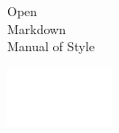 \documentclass[10pt,
	paper=14cm:21cm,
	DIV=12,
	headinclude=yes,
	footinclude=no,
	twoside=no]{scrartcl}
\begin{document}
{ %
\thispagestyle{empty}
\setlength\parindent{0pt}
\afterpage{\restorepagecolor}
\color{white}
\begin{raggedleft}

Open \\
Markdown \\
Manual of Style

\end{raggedleft}

\vfill

\begin{centering}

\includegraphics[height=48pt]{DialOA_logo_WhiteTransp}

\end{centering}

} %
\end{document}
